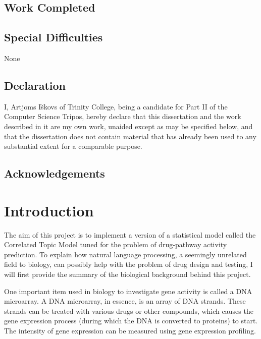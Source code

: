 \documentclass[12pt,a4paper,twoside,openright]{report}
\begin{document}
\section*{Work Completed}

\section*{Special Difficulties}
None
 
\newpage
\section*{Declaration}

I, Artjoms I\v{s}kovs of Trinity College, being a candidate for Part II of the Computer
Science Tripos, hereby declare that this dissertation and the work described in it are my own work,
unaided except as may be specified below, and that the dissertation does not contain material that has already been used to any substantial
extent for a comparable purpose.

\bigskip
{}

\medskip
{}

\tableofcontents

\listoffigures

\newpage
\section*{Acknowledgements}



\pagestyle{headings}

\chapter{Introduction}

The aim of this project is to implement a version of a statistical model called the Correlated Topic Model tuned for the problem of drug-pathway activity prediction. To explain how natural language processing, a seemingly unrelated field to biology, can possibly help with the problem of drug design and testing, I will first provide the summary of the biological background behind this project.

One important item used in biology to investigate gene activity is called a DNA microarray. A DNA microarray, in essence, is an array of DNA strands. These strands can be treated with various drugs or other compounds, which causes the gene expression process (during which the DNA is converted to proteins) to start. The intensity of gene expression can be measured using gene expression profiling.
\end{document}
